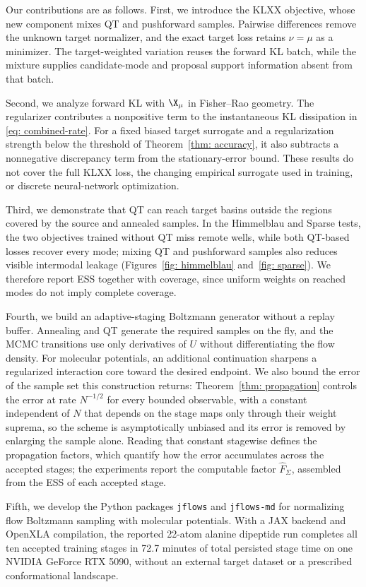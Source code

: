 \documentclass{article}
\begin{document}
Our contributions are as follows. First, we introduce the KLXX objective, whose new component mixes QT and pushforward samples. Pairwise differences remove the unknown target normalizer, and the exact target loss retains $\nu=\mu$ as a minimizer. The target-weighted variation reuses the forward KL batch, while the mixture supplies candidate-mode and proposal support information absent from that batch.

Second, we analyze forward KL with $\X_\mu$ in Fisher--Rao geometry. The regularizer contributes a nonpositive term to the instantaneous KL dissipation in \eqref{eq: combined-rate}. For a fixed biased target surrogate and a regularization strength below the threshold of Theorem~\ref{thm: accuracy}, it also subtracts a nonnegative discrepancy term from the stationary-error bound. These results do not cover the full KLXX loss, the changing empirical surrogate used in training, or discrete neural-network optimization.

Third, we demonstrate that QT can reach target basins outside the regions covered by the source and annealed samples. In the Himmelblau and Sparse tests, the two objectives trained without QT miss remote wells, while both QT-based losses recover every mode; mixing QT and pushforward samples also reduces visible intermodal leakage (Figures~\ref{fig: himmelblau} and~\ref{fig: sparse}). We therefore report ESS together with coverage, since uniform weights on reached modes do not imply complete coverage.

Fourth, we build an adaptive-staging Boltzmann generator without a replay buffer. Annealing and QT generate the required samples on the fly, and the MCMC transitions use only derivatives of $U$ without differentiating the flow density. For molecular potentials, an additional continuation sharpens a regularized interaction core toward the desired endpoint. We also bound the error of the sample set this construction returns: Theorem~\ref{thm: propagation} controls the error at rate $N^{-1/2}$ for every bounded observable, with a constant independent of $N$ that depends on the stage maps only through their weight suprema, so the scheme is asymptotically unbiased and its error is removed by enlarging the sample alone. Reading that constant stagewise defines the propagation factors, which quantify how the error accumulates across the accepted stages; the experiments report the computable factor $\hat F_\Sigma$, assembled from the ESS of each accepted stage.

Fifth, we develop the Python packages \texttt{jflows} and \texttt{jflows-md} for normalizing flow Boltzmann sampling with molecular potentials. With a JAX backend and OpenXLA compilation, the reported 22-atom alanine dipeptide run completes all ten accepted training stages in 72.7 minutes of total persisted stage time on one NVIDIA GeForce RTX 5090, without an external target dataset or a prescribed conformational landscape.
\end{document}

